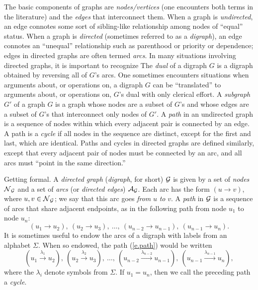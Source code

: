 The basic components of graphs are {\em nodes/vertices} (one
encounters both terms in the literature) and the {\em edges} that
interconnect them.  When a graph is {\em undirected}, an edge connotes
some sort of sibling-like relationship among nodes of ``equal''
status.  When a graph is {\em directed} (sometimes referred to as a
{\em digraph}), an edge connotes an ``unequal'' relationship such as
parenthood or priority or dependence; edges in directed graphs are
often termed {\em arcs}.  In many situations involving directed
graphs, it is important to recognize The {\em dual} of a digraph $G$
is a digraph obtained by reversing all of $G$'s arcs.  One sometimes
encounters situations when arguments about, or operations on, a
digraph $G$ can be ``translated'' to arguments about, or operations
on, $G$'s dual with only clerical effort.  A {\em subgraph} $G'$ of a
graph $G$ is a graph whose nodes are a subset of $G$'s and whose edges
are a subset of $G$'s that interconnect only nodes of $G'$.  A {\em
  path} in an undirected graph is a sequence of nodes within which
every adjacent pair is connected by an edge.  A path is a {\em cycle}
if all nodes in the sequence are distinct, except for the first and
last, which are identical.  Paths and cycles in directed graphs are
defined similarly, except that every adjacent pair of nodes must be
connected by an arc, and all arcs must ``point in the same
direction.''  

{\small\sf Getting formal}.
%
A {\it directed graph} ({\it digraph}, for short) $\mbox{$\cal G$}$ is given by a
set of {\it nodes} $\mbox{$\cal N$}_{\mbox{{\scriptsize $\cal G$}}}$ and a set of {\it arcs} (or {\it
  directed edges}) $\mbox{$\cal A$}_{\mbox{{\scriptsize $\cal G$}}}$.  Each arc has the form $(u \rightarrow
v)$, where $u, v \in \mbox{$\cal N$}_{\mbox{{\scriptsize $\cal G$}}}$; we say that this arc goes {\em from}
$u$ {\em to} $v$.  A {\it path} in $\mbox{$\cal G$}$ is a sequence of arcs that
share adjacent endpoints, as in the following path from node $u_1$ to
node $u_n$:
\begin{equation}
\label{e.path}
(u_1 \rightarrow u_2), \ (u_2 \rightarrow u_3), \ \ldots, \ (u_{n-2}
        \rightarrow u_{n-1}), \ (u_{n-1} \rightarrow u_n).
\end{equation}
It is sometimes useful to endow the arcs of a digraph with labels from
an alphabet $\Sigma$.  When so endowed, the path (\ref{e.path}) would
be written
\[
(u_1 \stackrel{\lambda_1}{\rightarrow} u_2), \ 
(u_2 \stackrel{\lambda_2}{\rightarrow} u_3), \ \ldots, \ 
(u_{n-2} \stackrel{\lambda_{n-2}}{\rightarrow} u_{n-1}), \ 
(u_{n-1} \stackrel{\lambda_{n-1}}{\rightarrow} u_n),
\]
where the $\lambda_i$ denote symbols from $\Sigma$.  If $u_1 = u_n$,
then we call the preceding path a {\em cycle}.

